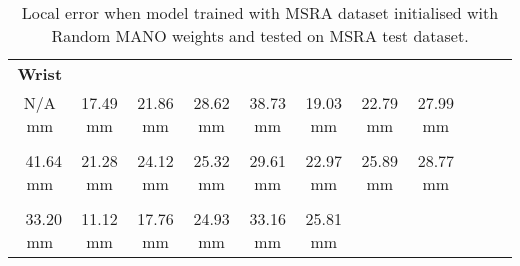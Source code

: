     \begin{table}[!ht]
    \begin{tabular}{|c|c|c|c|c|c|c|c|c|c|c|}
    \hline
    {\bfseries Wrist} & \cellcolor[HTML]{40ff00}{\bfseries IMCP} & \cellcolor[HTML]{80ff00}{\bfseries IPIP} & \cellcolor[HTML]{80ff00}{\bfseries IDIP} & \cellcolor[HTML]{bfff00}{\bfseries ITIP} & \cellcolor[HTML]{40ff00}{\bfseries MMCP} & \cellcolor[HTML]{80ff00}{\bfseries MPIP} & \cellcolor[HTML]{80ff00}{\bfseries MDIP}  \\
    N/A mm & \cellcolor[HTML]{40ff00}$\,\,\,$17.49 mm & \cellcolor[HTML]{80ff00}$\,\,\,$21.86 mm & \cellcolor[HTML]{80ff00}$\,\,\,$28.62 mm & \cellcolor[HTML]{bfff00}$\,\,\,$38.73 mm & \cellcolor[HTML]{40ff00}$\,\,\,$19.03 mm & \cellcolor[HTML]{80ff00}$\,\,\,$22.79 mm & \cellcolor[HTML]{80ff00}$\,\,\,$27.99 mm\\
    \hline
    \cellcolor[HTML]{ffff00}{\bfseries MTIP} & \cellcolor[HTML]{80ff00}{\bfseries RMCP} & \cellcolor[HTML]{80ff00}{\bfseries RPIP} & \cellcolor[HTML]{80ff00}{\bfseries RDIP} & \cellcolor[HTML]{80ff00}{\bfseries RTIP} & \cellcolor[HTML]{80ff00}{\bfseries PMCP} & \cellcolor[HTML]{80ff00}{\bfseries PPIP} & \cellcolor[HTML]{80ff00}{\bfseries PDIP}  \\
    \cellcolor[HTML]{ffff00}$\,\,\,$41.64 mm & \cellcolor[HTML]{80ff00}$\,\,\,$21.28 mm & \cellcolor[HTML]{80ff00}$\,\,\,$24.12 mm & \cellcolor[HTML]{80ff00}$\,\,\,$25.32 mm & \cellcolor[HTML]{80ff00}$\,\,\,$29.61 mm & \cellcolor[HTML]{80ff00}$\,\,\,$22.97 mm & \cellcolor[HTML]{80ff00}$\,\,\,$25.89 mm & \cellcolor[HTML]{80ff00}$\,\,\,$28.77 mm\\
    \hline
    \cellcolor[HTML]{bfff00}{\bfseries PTIP} & \cellcolor[HTML]{40ff00}{\bfseries TMCP} & \cellcolor[HTML]{40ff00}{\bfseries TPIP} & \cellcolor[HTML]{80ff00}{\bfseries PDIP} & \cellcolor[HTML]{bfff00}{\bfseries TTIP} & \cellcolor[HTML]{80ff00}{\bfseries Average}  \\
    \cellcolor[HTML]{bfff00}$\,\,\,$33.20 mm & \cellcolor[HTML]{40ff00}$\,\,\,$11.12 mm & \cellcolor[HTML]{40ff00}$\,\,\,$17.76 mm & \cellcolor[HTML]{80ff00}$\,\,\,$24.93 mm & \cellcolor[HTML]{bfff00}$\,\,\,$33.16 mm & \cellcolor[HTML]{80ff00}$\,\,\,$25.81 mm \\
    \cline{1-6}
    \end{tabular}
    \caption{Local error when model trained with MSRA dataset initialised with Random MANO weights and tested on MSRA test dataset.}
    \label{}
    \end{table}